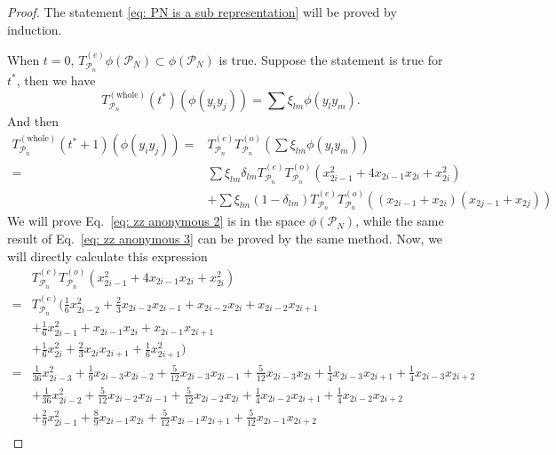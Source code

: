 \documentclass{article}
\newcommand{\Twhole}{T^{(\text{whole})}}
\begin{document}
\begin{proof}
    The statement \eqref{eq: PN is a sub representation} will be proved by induction.
    
     When $t=0$, $T^{(e)}_{\mathcal{P}_n} \phi(\mathcal{P}_N)\subset \phi(\mathcal{P}_N)$ is true.
     Suppose the statement is true for $t^*$, then we have
    \begin{equation}
        \Twhole_{\mathcal{P}_n}(t^*)(\phi(y_iy_j)) = \sum \xi_{lm} \phi(y_ly_m).
    \end{equation}
    And then
    \begin{align}
        \Twhole_{\mathcal{P}_n}(t^*+1)(\phi(y_i y_j)) =& 
        T^{(e)}_{\mathcal{P}_n}T^{(o)}_{\mathcal{P}_n} (\sum \xi_{lm} \phi(y_ly_m)) \\
        \label{eq: zz anonymous 2}
        =& \sum \xi_{lm} \delta_{lm}T^{(e)}_{\mathcal{P}_n}T^{(o)}_{\mathcal{P}_n} ( x_{2i-1}^2+4 x_{2i-1} x_{2i}+x_{2i}^2) \\
        \label{eq: zz anonymous 3}
        & + \sum \xi_{lm} (1-\delta_{lm})T^{(e)}_{\mathcal{P}_n}T^{(o)}_{\mathcal{P}_n}\left(\left(x_{2 i-1}+x_{2 i}\right)\left(x_{2 j-1}+x_{2 j}\right)\right)
    \end{align}
    We will prove Eq.~\eqref{eq: zz anonymous 2} is in the space $\phi(\mathcal{P}_N)$, while the same result of Eq.~\eqref{eq: zz anonymous 3} can be proved by the same method. Now, we will directly calculate this expression
    \begin{equation}
    \begin{aligned}
        \label{eq: zz anonymous 4}
        &T^{(e)}_{\mathcal{P}_n}T^{(o)}_{\mathcal{P}_n} ( x_{2i-1}^2+4 x_{2i-1} x_{2i}+x_{2i}^2) \\
        =& T^{(e)}_{\mathcal{P}_n}(\frac{1}{6}x_{2i-2}^2 + \frac{2}{3} x_{2i-2}x_{2i-1} + x_{2i-2}x_{2i}+x_{2i-2}x_{2i+1} \\
        &+\frac{1}{6} x_{2i-1}^2 + x_{2i-1}x_{2i} + x_{2i-1}x_{2i+1}  \\
        &+\frac{1}{6} x_{2i}^2 + \frac{2}{3} x_{2i}x_{2i+1} + \frac{1}{6}x_{2i+1}^2  )\\
        =& \frac{1}{36}x_{2i-3}^2 + \frac{1}{9} x_{2i-3}x_{2i-2} +\frac{5}{12} x_{2i-3}x_{2i-1}+ \frac{5}{12} x_{2i-3}x_{2i}  + \frac{1}{4} x_{2i-3}x_{2i+1} + \frac{1}{4} x_{2i-3}x_{2i+2}  \\
        &+ \frac{1}{36}x_{2i-2}^2 + \frac{5}{12} x_{2i-2}x_{2i-1}+ \frac{5}{12} x_{2i-2}x_{2i}  + \frac{1}{4} x_{2i-2}x_{2i+1} + \frac{1}{4} x_{2i-2}x_{2i+2}  \\
        &+ \frac{2}{9}x_{2i-1}^2 + \frac{8}{9} x_{2i-1}x_{2i} + \frac{5}{12} x_{2i-1}x_{2i+1} + \frac{5}{12} x_{2i-1}x_{2i+2}\\

\end{aligned}
\end{equation}
\end{proof}
\end{document}
